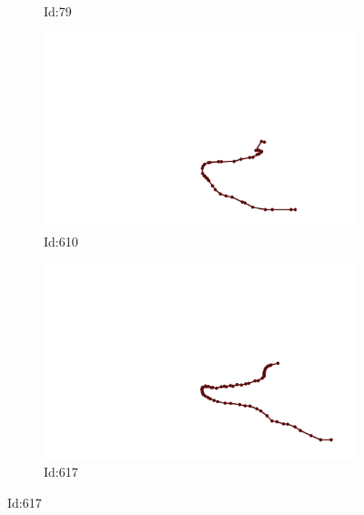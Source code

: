 \documentclass[12pt,twoside]{report}
\begin{document}
\begin{figure}
\begin{subfigure}[b]{0.20\textwidth}
\caption{Id:79}
\end{subfigure}
\begin{subfigure}[b]{0.20\textwidth}
\centering
\includegraphics[width=\textwidth]{../../trajectories/610.png}
\caption{Id:610}
\end{subfigure}
\begin{subfigure}[b]{0.20\textwidth}
\centering
\includegraphics[width=\textwidth]{../../trajectories/617.png}
\caption{Id:617}
\end{subfigure}
\end{figure}
\end{document}

